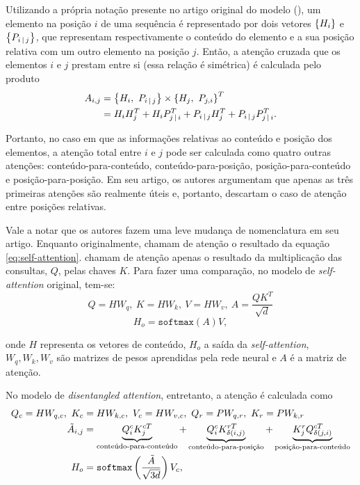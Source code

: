 Utilizando a própria notação presente no artigo original do modelo
(\cite{he-etal:2020:deberta}), um elemento na posição $i$ de uma sequência é
representado por dois vetores $\left\{ H_i \right\}$ e $\left\{ P_{i\,|\, j} \right\}$, que
representam respectivamente o conteúdo do elemento e a sua posição relativa com
um outro elemento na posição $j$. Então, a atenção cruzada que os elementos $i$
e $j$ prestam entre si (essa relação é simétrica) é calculada pelo produto
\begin{equation} \label{eq:deberta-atenttion}
\begin{split}
   A_{i,j}&=\left\{ H_i,~P_{i\,|\, j} \right\}\times\left\{ H_j,~P_{j,i} \right\}^{T} \\
          &=H_iH_j^{T} +
          H_iP_{j\,|\, i}^{T} +
          P_{i\,|\, j}H_j^{T} +
          P_{i\,|\, j}P_{j\,|\, i}^{T}.
\end{split}
\end{equation}

Portanto, no caso em que as informações relativas ao conteúdo e posição dos
elementos, a atenção total entre $i$ e $j$ pode ser calculada como quatro outras
atenções: conteúdo-para-conteúdo, conteúdo-para-posição, posição-para-conteúdo e
posição-para-posição. Em seu artigo, os autores argumentam que apenas as três
primeiras atenções são realmente úteis e, portanto, descartam o caso de atenção
entre posições relativas.

Vale a notar que os autores fazem uma leve mudança de nomenclatura em seu
artigo. Enquanto originalmente,
\cite{vaswani-etal:2017:attention-is-all-you-need} chamam de atenção o resultado
da equação \ref{eq:self-attention}. \cite{he-etal:2020:deberta} chamam de
atenção apenas o resultado da multiplicação das consultas, $Q$, pelas chaves
$K$. Para fazer uma comparação, no modelo de \textit{self-attention} original,
tem-se:
\[
Q=HW_q,~K=HW_k,~V=HW_v,~A=\dfrac{QK^{T}}{\sqrt{d}}
\]
\[
H_o=\texttt{softmax}(A)V,
\]

onde $H$ representa os vetores de conteúdo, $H_o$ a saída da
\textit{self-attention}, $W_q,W_k,W_v$ são matrizes de pesos aprendidas pela
rede neural e $A$ é a matriz de atenção.

No modelo de \textit{disentangled attention}, entretanto, a atenção é calculada
como
\begin{equation}
\begin{split}
   Q_c=HW_{q,c},~K_c&=HW_{k,c},~V_c=HW_{v,c},~Q_r=PW_{q,r},~K_r=PW_{k,r} \\
   \tilde{A}_{i,j}&=\underbrace{Q^{c}_iK^{cT}_j}_{\text{conteúdo-para-conteúdo}} +
   \underbrace{Q^{c}_iK^{rT}_{\delta(i,j)}}_{\text{conteúdo-para-posição}} +
   \underbrace{K^{r}_jQ^{cT}_{\delta(j,i)}}_{\text{posição-para-conteúdo}} \\
   H_o&=\texttt{softmax}\left( \dfrac{\tilde{A}}{\sqrt{3d}} \right)V_c,
\end{split}
\end{equation}

